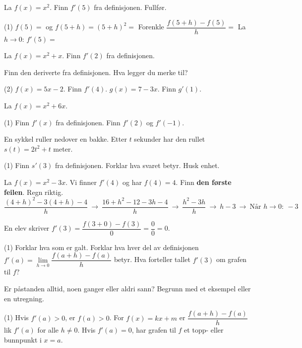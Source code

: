 
La $f(x) = x^2$. Finn $f'(5)$ fra definisjonen. Fullfør.
\begin{tasks}(1)
  \task $f(5) =$ \skrivlinje[2cm] \quad og \quad $f(5 + h) = (5 + h)^2 =$ \skrivlinje[4cm]
  \task Forenkle $\dfrac{f(5 + h) - f(5)}{h} =$ \skrivlinje[4cm]
  \task La $h \to 0$: \quad $f'(5) =$ \skrivlinje[2cm]
\end{tasks}

La $f(x) = x^2 + x$. Finn $f'(2)$ fra definisjonen.

Finn den deriverte fra definisjonen. Hva legger du merke til?
\begin{tasks}(2)
  \task $f(x) = 5x - 2$. Finn $f'(4)$.
  \task $g(x) = 7 - 3x$. Finn $g'(1)$.
\end{tasks}


La $f(x) = x^2 + 6x$.
\begin{tasks}(1)
  \task Finn $f'(x)$ fra definisjonen.
  \task Finn $f'(2)$ og $f'(-1)$.
\end{tasks}

En sykkel ruller nedover en bakke. Etter $t$ sekunder har den rullet $s(t) = 2t^2 + t$ meter.
\begin{tasks}(1)
  \task Finn $s'(3)$ fra definisjonen.
  \task Forklar hva svaret betyr. Husk enhet.
\end{tasks}

La $f(x) = x^2 - 3x$. Vi finner $f'(4)$ og har $f(4) = 4$. Finn \textbf{den første feilen}. Regn riktig.
\[ \frac{(4 + h)^2 - 3(4 + h) - 4}{h} \ \longrightarrow\ \frac{16 + h^2 - 12 - 3h - 4}{h} \ \longrightarrow\ \frac{h^2 - 3h}{h} \ \longrightarrow\ h - 3 \ \longrightarrow\ \text{Når } h \to 0:\ -3 \]

En elev skriver $f'(3) = \dfrac{f(3 + 0) - f(3)}{0} = \dfrac{0}{0} = 0$.
\begin{tasks}(1)
  \task Forklar hva som er galt.
  \task Forklar hva hver del av definisjonen $f'(a) = \lim\limits_{h \to 0} \dfrac{f(a + h) - f(a)}{h}$ betyr.
  \task Hva forteller tallet $f'(3)$ om grafen til $f$?
\end{tasks}


Er påstanden alltid, noen ganger eller aldri sann? Begrunn med et eksempel eller en utregning.
\begin{tasks}(1)
  \task Hvis $f'(a) > 0$, er $f(a) > 0$.
  \task For $f(x) = kx + m$ er $\dfrac{f(a + h) - f(a)}{h}$ lik $f'(a)$ for alle $h \neq 0$.
  \task Hvis $f'(a) = 0$, har grafen til $f$ et topp- eller bunnpunkt i $x = a$.
\end{tasks}

